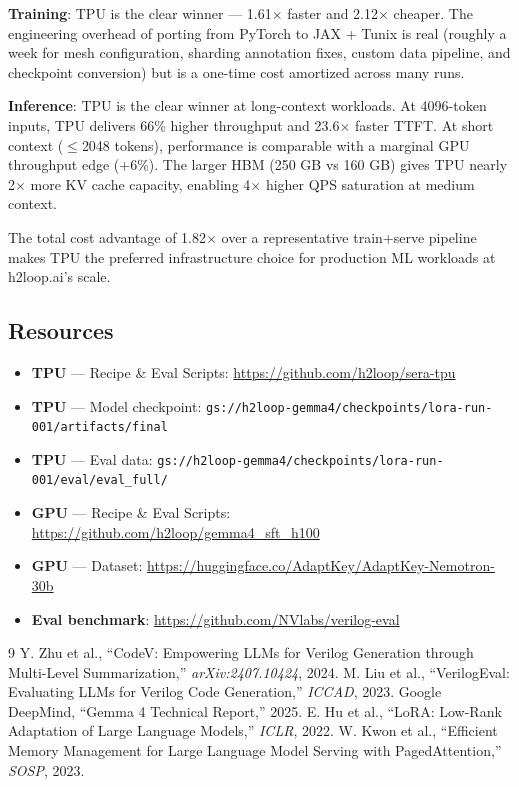 \documentclass[11pt,a4paper]{article}
\begin{document}
\textbf{Training}: TPU is the clear winner --- 1.61$\times$ faster and 2.12$\times$ cheaper. The engineering overhead of porting from PyTorch to JAX + Tunix is real (roughly a week for mesh configuration, sharding annotation fixes, custom data pipeline, and checkpoint conversion) but is a one-time cost amortized across many runs.

\textbf{Inference}: TPU is the clear winner at long-context workloads. At 4096-token inputs, TPU delivers 66\% higher throughput and 23.6$\times$ faster TTFT. At short context ($\leq$2048 tokens), performance is comparable with a marginal GPU throughput edge (+6\%). The larger HBM (250 GB vs 160 GB) gives TPU nearly 2$\times$ more KV cache capacity, enabling 4$\times$ higher QPS saturation at medium context.

The total cost advantage of 1.82$\times$ over a representative train+serve pipeline makes TPU the preferred infrastructure choice for production ML workloads at h2loop.ai's scale.

\subsection{Resources}

\begin{itemize}[nosep]
  \item \textbf{TPU} --- Recipe \& Eval Scripts: \url{https://github.com/h2loop/sera-tpu}
  \item \textbf{TPU} --- Model checkpoint: \texttt{gs://h2loop-gemma4/checkpoints/lora-run-001/artifacts/final}
  \item \textbf{TPU} --- Eval data: \texttt{gs://h2loop-gemma4/checkpoints/lora-run-001/eval/eval\_full/}
  \item \textbf{GPU} --- Recipe \& Eval Scripts: \url{https://github.com/h2loop/gemma4_sft_h100}
  \item \textbf{GPU} --- Dataset: \url{https://huggingface.co/AdaptKey/AdaptKey-Nemotron-30b}
  \item \textbf{Eval benchmark}: \url{https://github.com/NVlabs/verilog-eval}
\end{itemize}

\begin{thebibliography}{9}
 Y. Zhu et al., ``CodeV: Empowering LLMs for Verilog Generation through Multi-Level Summarization,'' \textit{arXiv:2407.10424}, 2024.
 M. Liu et al., ``VerilogEval: Evaluating LLMs for Verilog Code Generation,'' \textit{ICCAD}, 2023.
 Google DeepMind, ``Gemma 4 Technical Report,'' 2025.
 E. Hu et al., ``LoRA: Low-Rank Adaptation of Large Language Models,'' \textit{ICLR}, 2022.
 W. Kwon et al., ``Efficient Memory Management for Large Language Model Serving with PagedAttention,'' \textit{SOSP}, 2023.
\end{thebibliography}
\end{document}

